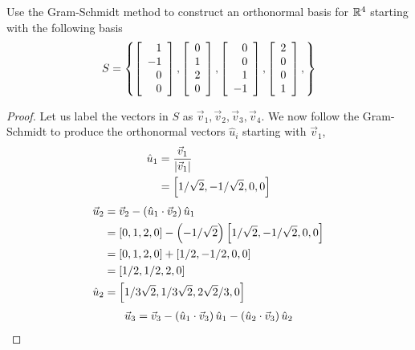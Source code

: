 \documentclass{tutorial}
\begin{document}
\begin{prob}
Use the Gram-Schmidt method to construct an orthonormal basis for $\mathbb{R}^4$ starting with the following basis
\[
  S = \left\{
    \left[ \begin{array}{r} 1 \\ -1 \\  0 \\  0 \end{array} \right],
    \left[ \begin{array}{r} 0 \\  1 \\  2 \\  0 \end{array} \right],
    \left[ \begin{array}{r} 0 \\  0 \\  1 \\ -1 \end{array} \right],
    \left[ \begin{array}{r} 2 \\  0 \\  0 \\  1 \end{array} \right],
  \right\}
\]
\end{prob} \ifsolns \begin{proof}
Let us label the vectors in $S$ as $\vec{v}_1, \vec{v}_2, \vec{v}_3, \vec{v}_4$. We now follow the Gram-Schmidt to produce the orthonormal vectors $\hat{u}_i$ starting with $\vec{v}_1$,
\begin{align*}
  \hat{u}_1   &= \frac{\vec{v}_1}{|\vec{v}_1|} \\
              &= \left[ 1/\sqrt{2}, -1/\sqrt{2}, 0, 0 \right] \\
\end{align*}
\begin{align*}
  \vec{u}_2   &= \vec{v}_2 - \left( \hat{u}_1 \cdot \vec{v}_2 \right) \hat{u}_1 \\
              &= \left[ 0, 1, 2, 0 \right] - \left( -1/\sqrt{2} \right) \left[ 1/\sqrt{2}, -1/\sqrt{2}, 0, 0 \right] \\
              &= \left[ 0, 1, 2, 0 \right] + \left[ 1/2, -1/2, 0, 0 \right] \\
              &= \left[ 1/2, 1/2, 2, 0 \right] \\
  \hat{u}_2   &= \left[ 1/3\sqrt{2}, 1/3\sqrt{2}, 2\sqrt{2}/3, 0 \right]
\end{align*}
\begin{align*}
  \vec{u}_3   &= \vec{v}_3 - \lp \hat{u}_1 \cdot \vec{v}_3 \rp \hat{u}_1 - \lp \hat{u}_2 \cdot \vec{v}_3 \rp \hat{u}_2 \\

\end{align*}
\end{proof}
\end{document}
